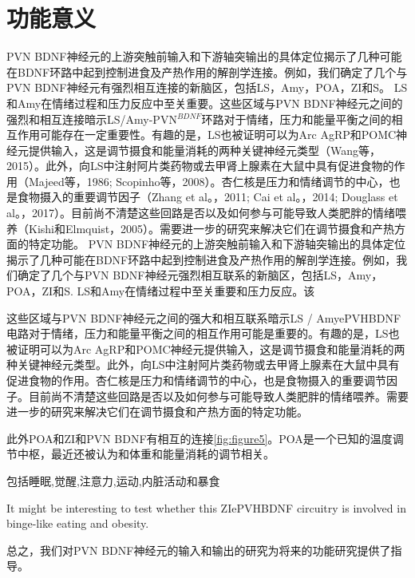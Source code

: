\section{功能意义}
PVN BDNF神经元的上游突触前输入和下游轴突输出的具体定位揭示了几种可能在BDNF环路中起到控制进食及产热作用的解剖学连接。例如，我们确定了几个与PVN BDNF神经元有强烈相互连接的新脑区，包括LS，Amy，POA，ZI和S。 LS和Amy在情绪过程和压力反应中至关重要\citep{yadin1993role, menard1996lateral}。这些区域与PVN BDNF神经元之间的强烈和相互连接暗示LS/Amy-PVN$^{BDNF}$环路对于情绪，压力和能量平衡之间的相互作用可能存在一定重要性。有趣的是，LS也被证明可以为Arc AgRP和POMC神经元提供输入，这是调节摄食和能量消耗的两种关键神经元类型（Wang等，2015）。此外，向LS中注射阿片类药物或去甲肾上腺素在大鼠中具有促进食物的作用（Majeed等，1986; Scopinho等，2008）。杏仁核是压力和情绪调节的中心，也是食物摄入的重要调节因子（Zhang et al。，2011; Cai et al。，2014; Douglass et al。，2017）。目前尚不清楚这些回路是否以及如何参与可能导致人类肥胖的情绪喂养（Kishi和Elmquist，2005）。需要进一步的研究来解决它们在调节摄食和产热方面的特定功能。
PVN BDNF神经元的上游突触前输入和下游轴突输出的具体定位揭示了几种可能在BDNF环路中起到控制进食及产热作用的解剖学连接。例如，我们确定了几个与PVN BDNF神经元强烈相互联系的新脑区，包括LS，Amy，POA，ZI和S. LS和Amy在情绪过程中至关重要和压力反应\citep{yadin1993role,menard1996lateral}。该

这些区域与PVN BDNF神经元之间的强大和相互联系暗示LS / AmyePVHBDNF电路对于情绪，压力和能量平衡之间的相互作用可能是重要的。有趣的是，LS也被证明可以为Arc AgRP和POMC神经元提供输入，这是调节摄食和能量消耗的两种关键神经元类型\citep{wang2015whole}。此外，向LS中注射阿片类药物或去甲肾上腺素在大鼠中具有促进食物的作用\citep{majeed1986stimulation,scopinho2008alpha1}。杏仁核是压力和情绪调节的中心，也是食物摄入的重要调节因子\citep{zhang2011amygdala,cai2014central,douglass2017central}。目前尚不清楚这些回路是否以及如何参与可能导致人类肥胖的情绪喂养\citep{kishi2005body}。需要进一步的研究来解决它们在调节摄食和产热方面的特定功能。



此外POA和ZI和PVN BDNF有相互的连接\figurename{\ref{fig:figure5}}。POA是一个已知的温度调节中枢，最近还被认为和体重和能量消耗的调节相关\citep{morrison2011central,yu2016glutamatergic,zhao2017hypothalamic,tan2018regulation}。

包括睡眠\citep{liu2017lhx6},觉醒\citep{roger1985afferents,power2001evidence},注意力\citep{chometton2017rostromedial,tait2017effects},运动\citep{milner1988electrical,supko1991activation,murer1993circling,perier2002behavioral},内脏活动\citep{huang1974differential,walsh1977some}和暴食\citep{zhang2017rapid}

It might be interesting to test whether this ZIePVHBDNF circuitry is involved in binge-like eating and obesity. 

总之，我们对PVN BDNF神经元的输入和输出的研究为将来的功能研究提供了指导。



